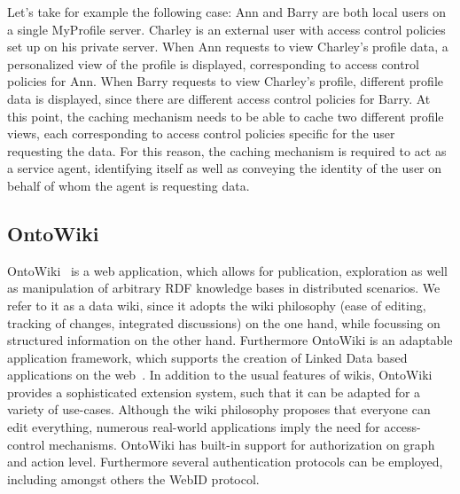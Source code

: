 \documentclass[a4paper]{llncs}
\begin{document}
Let's take for example the following case:
Ann and Barry are both local users on a single MyProfile server.
Charley is an external user with access control policies set up on his private server.
When Ann requests to view Charley's profile data, a personalized view of the profile is displayed, corresponding to access control policies for Ann.
When Barry requests to view Charley's profile, different profile data is displayed, since there are different access control policies for Barry.
At this point, the caching mechanism needs to be able to cache two different profile views, each corresponding to access control policies specific for the user requesting the data.
For this reason, the caching mechanism is required to act as a service agent, identifying itself as well as conveying the identity of the user on  behalf of whom the agent is requesting data.

\subsection{OntoWiki}
OntoWiki~\cite{auer-s-2006-736-a} is a web application, which allows for publication, exploration as well as manipulation of arbitrary RDF knowledge bases in distributed scenarios.
We refer to it as a data wiki, since it adopts the wiki philosophy (ease of editing, tracking of changes, integrated discussions) on the one hand, while focussing on structured information on the other hand.
Furthermore OntoWiki is an adaptable application framework, which supports the creation of Linked Data based applications on the web~\cite{heino-n-2009-61-a}.
In addition to the usual features of wikis, OntoWiki provides a sophisticated extension system, such that it can be adapted for a variety of use-cases.
Although the wiki philosophy proposes that everyone can edit everything, numerous real-world applications imply the need for access-control mechanisms.
OntoWiki has built-in support for authorization on graph and action level.
Furthermore several authentication protocols can be employed, including amongst others the WebID protocol.
\end{document}
